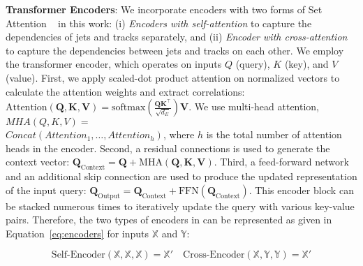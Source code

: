 


\textbf{Transformer Encoders}: We incorporate encoders with two forms of Set Attention ~\cite{SetAttention} in this work: (i) \emph{Encoders with self-attention} to capture the dependencies of jets and tracks separately, and (ii) \emph{Encoder with cross-attention} to capture the dependencies between jets and tracks on each other. We employ the transformer encoder, which operates on inputs \(Q\) (query), \(K\) (key), and \(V\) (value). First, we apply scaled-dot product attention on normalized vectors to calculate the attention weights and extract correlations: $\text{Attention}(\mathbf{Q}, \mathbf{K}, \mathbf{V}) = \text{softmax}\left(\frac{\mathbf{Q} \mathbf{K}^\top}{\sqrt{d_E}}\right) \mathbf{V}$. We use multi-head attention, $MHA(Q,K,V) = $\\
$ Concat(Attention_1,\ldots,Attention_h)$, where $h$ is the total number of attention heads in the encoder. Second, a residual connections is used to generate the context vector: $\mathbf{Q}_\text{Context} = \mathbf{Q} + \text{MHA}(\mathbf{Q}, \mathbf{K}, \mathbf{V})$. Third, a feed-forward network and an additional skip connection are used to produce the updated representation of the input query: $\mathbf{Q}_\text{Output} = \mathbf{Q}_{\text{Context}} + \text{FFN}(\mathbf{Q}_{\text{Context}})$. This encoder block can be stacked numerous times to iteratively update the query with various key-value pairs. Therefore, the two types of encoders in \myname{} can be represented as given in Equation~\ref{eq:encoders} for inputs $\mathbb{X}$ and $\mathbb{Y}$:

\begin{equation}
    \text{Self-Encoder}(\mathbb{X},\mathbb{X},\mathbb{X}) = \mathbb{X}' \quad \text{Cross-Encoder}(\mathbb{X},\mathbb{Y},\mathbb{Y}) = \mathbb{X}'
    \label{eq:encoders}
\end{equation}

